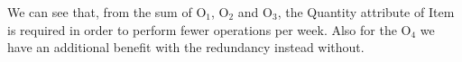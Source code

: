 We can see that, from the sum of $ \textrm{O}_\textrm{1}$, $ \textrm{O}_\textrm{2}$ and $ \textrm{O}_\textrm{3}$, the Quantity attribute of Item is required in order to perform fewer operations per week. Also for the $ \textrm{O}_\textrm{4}$ we have an additional benefit with the redundancy instead without.
